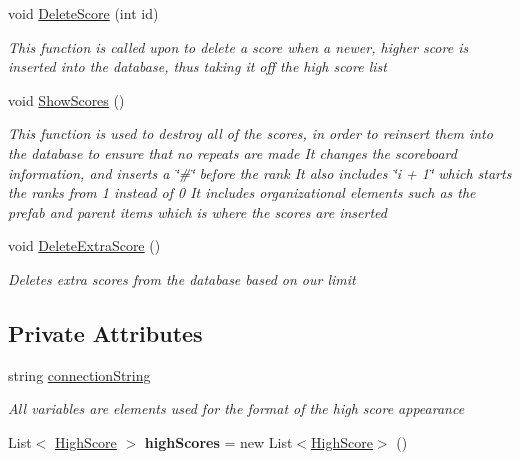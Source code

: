 \begin{DoxyCompactItemize}
void \mbox{\hyperlink{class_high_score_manager_a2051e83d70923629fdc6bd68c7e4eac9}{Delete\+Score}} (int id)
\begin{DoxyCompactList}\small\item\em This function is called upon to delete a score when a newer, higher score is inserted into the database, thus taking it off the high score list \end{DoxyCompactList}\item 
void \mbox{\hyperlink{class_high_score_manager_ab3e52344cd580a8e4e68f741361072e4}{Show\+Scores}} ()
\begin{DoxyCompactList}\small\item\em This function is used to destroy all of the scores, in order to reinsert them into the database to ensure that no repeats are made It changes the scoreboard information, and inserts a \char`\"{}\#\char`\"{} before the rank It also includes \char`\"{}i + 1\char`\"{} which starts the ranks from 1 instead of 0 It includes organizational elements such as the prefab and parent items which is where the scores are inserted \end{DoxyCompactList}\item 
void \mbox{\hyperlink{class_high_score_manager_a6b8807e7293dddf882b3faf180e68ecd}{Delete\+Extra\+Score}} ()
\begin{DoxyCompactList}\small\item\em Deletes extra scores from the database based on our limit \end{DoxyCompactList}\end{DoxyCompactItemize}
\subsection*{Private Attributes}
\begin{DoxyCompactItemize}
\item 
string \mbox{\hyperlink{class_high_score_manager_a9d8d74d89d2986ad69f282c1129d04a9}{connection\+String}}
\begin{DoxyCompactList}\small\item\em All variables are elements used for the format of the high score appearance \end{DoxyCompactList}\item 
\mbox{\label{class_high_score_manager_a9fa93771421f2616616eb71cd1e6ec2d}} 
List$<$ \mbox{\hyperlink{class_high_score}{High\+Score}} $>$ {\bfseries high\+Scores} = new List$<$\mbox{\hyperlink{class_high_score}{High\+Score}}$>$ ()
\end{DoxyCompactItemize}


